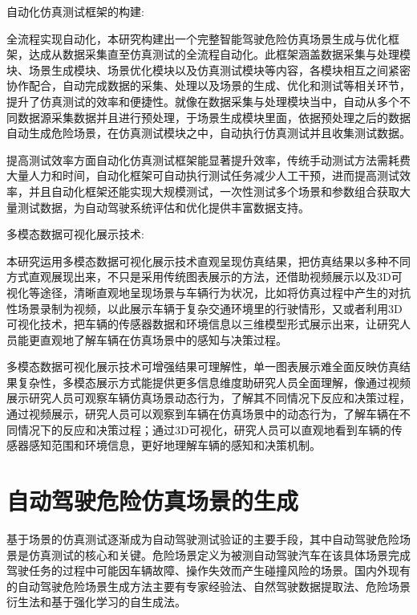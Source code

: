 自动化仿真测试框架的构建:

全流程实现自动化，本研究构建出一个完整智能驾驶危险仿真场景生成与优化框架，达成从数据采集直至仿真测试的全流程自动化。此框架涵盖数据采集与处理模块、场景生成模块、场景优化模块以及仿真测试模块等内容，各模块相互之间紧密协作配合，自动完成数据的采集、处理以及场景的生成、优化和测试等相关环节，提升了仿真测试的效率和便捷性。就像在数据采集与处理模块当中，自动从多个不同数据源采集数据并且进行预处理，于场景生成模块里面，依据预处理之后的数据自动生成危险场景，在仿真测试模块之中，自动执行仿真测试并且收集测试数据\cite{ma2018data}。

提高测试效率方面自动化仿真测试框架能显著提升效率，传统手动测试方法需耗费大量人力和时间，自动化框架可自动执行测试任务减少人工干预，进而提高测试效率，并且自动化框架还能实现大规模测试，一次性测试多个场景和参数组合获取大量测试数据，为自动驾驶系统评估和优化提供丰富数据支持。

多模态数据可视化展示技术:

本研究运用多模态数据可视化展示技术直观呈现仿真结果，把仿真结果以多种不同方式直观展现出来，不只是采用传统图表展示的方法，还借助视频展示以及3D可视化等途径，清晰直观地呈现场景与车辆行为状况，比如将仿真过程中产生的对抗性场景录制为视频，以此展示车辆于复杂交通环境里的行驶情形，又或者利用3D可视化技术，把车辆的传感器数据和环境信息以三维模型形式展示出来，让研究人员能更直观地了解车辆在仿真场景中的感知与决策过程。

多模态数据可视化展示技术可增强结果可理解性，单一图表展示难全面反映仿真结果复杂性，多模态展示方式能提供更多信息维度助研究人员全面理解，像通过视频展示研究人员可观察车辆仿真场景动态行为，了解其不同情况下反应和决策过程，通过视频展示，研究人员可以观察到车辆在仿真场景中的动态行为，了解车辆在不同情况下的反应和决策过程；通过3D可视化，研究人员可以直观地看到车辆的传感器感知范围和环境信息，更好地理解车辆的感知和决策机制。




\section{自动驾驶危险仿真场景的生成}

基于场景的仿真测试逐渐成为自动驾驶测试验证的主要手段，其中自动驾驶危险场景是仿真测试的核心和关键。危险场景定义为被测自动驾驶汽车在该具体场景完成驾驶任务的过程中可能因车辆故障、操作失效而产生碰撞风险的场景。国内外现有的自动驾驶危险场景生成方法主要有专家经验法、自然驾驶数据提取法、危险场景衍生法和基于强化学习的自生成法。


